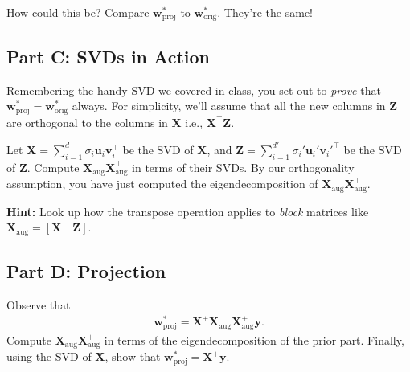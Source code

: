 \documentclass{article}
\begin{document}
How could this be?
Compare $\mathbf{w}^*_\text{proj}$ to $\mathbf{w}^*_\text{orig}$. They're the same!

\subsection*{Part C: SVDs in Action}

Remembering the handy SVD we covered in class, you set out to \textit{prove} that $\mathbf{w}^*_\text{proj} = \mathbf{w}^*_\text{orig}$ always.
For simplicity, we'll assume that all the new columns in $\mathbf{Z}$ are orthogonal to the columns in $\mathbf{X}$ i.e., $\mathbf{X}^\top \mathbf{Z}$.

Let $\mathbf{X} = \sum_{i=1}^d \sigma_i \mathbf{u}_i \mathbf{v}_i^\top$ be the SVD of $\mathbf{X}$, and $\mathbf{Z} = \sum_{i=1}^{d'} \sigma_i' \mathbf{u}_i' {\mathbf{v}_i'}^\top$ be the SVD of $\mathbf{Z}$.
Compute $\mathbf{X}_\text{aug} \mathbf{X}_\text{aug}^\top$ in terms of their SVDs.
By our orthogonality assumption, you have just computed the eigendecomposition of $\mathbf{X}_\text{aug} \mathbf{X}_\text{aug}^\top$.

\textbf{Hint:} Look up how the transpose operation applies to \textit{block} matrices like $\mathbf{X}_\text{aug} = [\mathbf{X} \quad \mathbf{Z}]$.

\subsection*{Part D: Projection}

Observe that
\begin{align}
\mathbf{w}^*_\text{proj} = \mathbf{X}^+ \mathbf{X}_\text{aug} \mathbf{X}_\text{aug}^+ \mathbf{y}.
\end{align}
Compute $\mathbf{X}_\text{aug} \mathbf{X}_\text{aug}^+$ in terms of the eigendecomposition of the prior part.
Finally, using the SVD of $\mathbf{X}$, show that $\mathbf{w}^*_\text{proj} = \mathbf{X}^+ \mathbf{y}.$

%
\end{document}
